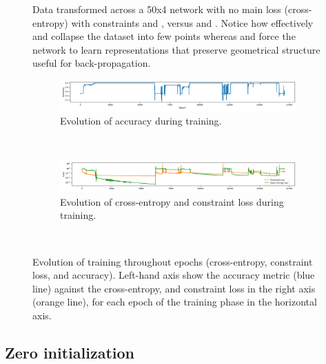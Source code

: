 \begin{figure}
  \caption{Data transformed across a 50x4 network with no main loss (cross-entropy) with constraints \SepLayer and \SepUnitPoint, versus \ReLU and \ReLUBN. Notice how effectively \ReLU and \ReLUBN collapse the dataset into few points whereas \SepLayer and \SepUnitPoint force the network to learn representations that preserve geometrical structure useful for back-propagation.} 
  \label{fig:init} 
\end{figure}



\begin{figure}[h]
   
    \begin{subfigure}[c]{1\textwidth}
        \includegraphics[width=1\textwidth]{img/convergence/peaks_acc.pdf}
        \caption{Evolution of accuracy during training.}
        \label{fig:accuracy_convergence}
    \end{subfigure}
    \\
    
    \begin{subfigure}[c]{1\textwidth}
    \centering
        \includegraphics[width=1\textwidth]{img/convergence/peaks_loss.pdf}
        \caption{Evolution of cross-entropy and constraint loss during training.}
        \label{fig:loss_convergence}
    \end{subfigure}
    \\
   
    
      \caption{Evolution of training throughout epochs (cross-entropy, constraint loss, and accuracy). Left-hand axis show the accuracy metric (blue line) against the cross-entropy, and constraint loss in the right axis (orange line), for each epoch of the training phase in the horizontal axis.}
	\label{fig:peaks}
\end{figure}


\subsection{Zero initialization}\label{subsec:zero}

